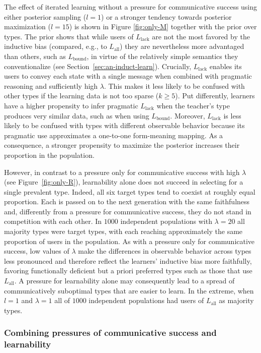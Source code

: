 \documentclass[a4paper, 11pt]{article}
\theoremstyle{Satz}
\newcommand{\mylang}[1]{\ensuremath{L_{\text{#1}}}\xspace} %
\newcommand{\Lall}{\mylang{all}}
\newcommand{\Lbound}{\mylang{bound}}
\newcommand{\Llack}{\mylang{lack}}
\begin{document}
The effect of iterated learning without a pressure for communicative success using either posterior
sampling ($l = 1$) or a stronger tendency towards posterior maximization ($l = 15$) is shown in
Figure \ref{fig:only-M} together with the prior over types. The prior shows that while users of
$\Llack$ are not the most favored by the inductive bias (compared, e.g., to $\Lall$) they are
nevertheless more advantaged than others, such as $\Lbound$, in virtue of the relatively simple
semantics they conventionalize (see Section~\ref{sec:an-induct-learn}). Crucially, $\Llack$
enables its users to convey each state with a single message when combined with pragmatic
reasoning and sufficiently high $\lambda$. This makes it less likely to be confused with
other types if the learning data is not too sparse ($k \geq 5$). Put differently, learners have
a higher propensity to infer pragmatic $\Llack$ when the teacher's type produces very similar
data, such as when using $\Lbound$. Moreover, $\Llack$ is less likely to be confused with
types with different observable behavior because its pragmatic use approximates a one-to-one
form-meaning mapping. As a consequence, a stronger propensity to maximize the posterior
increases their proportion in the population.

However, in contrast to a pressure only for communicative success with high $\lambda$ (see
Figure~\ref{fig:only-R}), learnability alone does not succeed in selecting for a single
prevalent type. Indeed, all six target types tend to coexist at roughly equal proportion. Each
is passed on to the next generation with the same faithfulness and, differently from a pressure
for communicative success, they do not stand in competition with each other. In $1000$
independent populations with $\lambda = 20$ all majority types were target types,
with each reaching approximately the same proportion of users in the population. As
with a pressure only for communicative success, low values of $\lambda$ make the differences in observable behavior
across types less pronounced and therefore reflect the learners' inductive bias more
faithfully, favoring functionally deficient but a priori preferred types such as those that use
$\Lall$. A pressure for learnability alone may consequently lead to a spread of communicatively
suboptimal types that are easier to learn. In the extreme, when $l = 1$ and $\lambda = 1$ all
of $1000$ independent populations had users of $\Lall$ as majority types.

\subsubsection{Combining pressures of communicative success and learnability}
\end{document}
